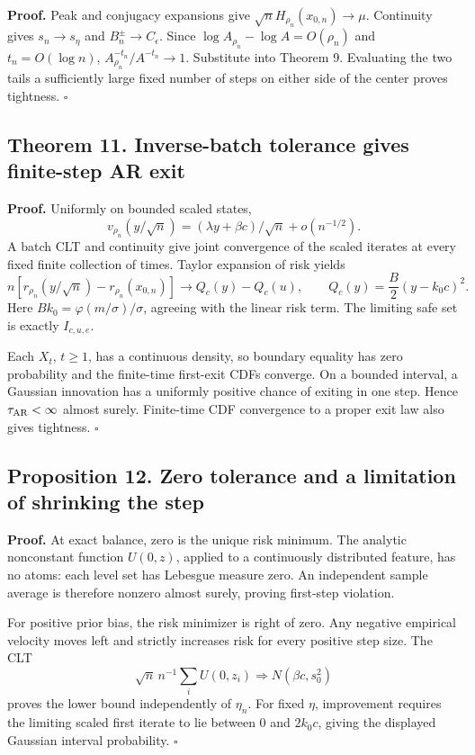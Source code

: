 \textbf{Proof.} Peak and conjugacy expansions give
\(\sqrt nH_{\rho_n}(x_{0,n})\to\mu\). Continuity gives \(s_n\to s_\eta\)
and \(B_n^\pm\to C_\epsilon\). Since
\(\log A_{\rho_n}-\log A=O(\rho_n)\) and \(t_n=O(\log n)\),
\(A_{\rho_n}^{-t_n}/A^{-t_n}\to1\). Substitute into Theorem 9.
Evaluating the two tails a sufficiently large fixed number of steps on
either side of the center proves tightness. \(\square\)

\subsection{Theorem 11. Inverse-batch tolerance gives finite-step AR
exit}\label{gaussian_proofs-theorem-11.-inverse-batch-tolerance-gives-finite-step-ar-exit}

\textbf{Proof.} Uniformly on bounded scaled states, \[
v_{\rho_n}(y/\sqrt n)
=(\lambda y+\beta c)/\sqrt n+o(n^{-1/2}).
\] A batch CLT and continuity give joint convergence of the scaled
iterates at every fixed finite collection of times. Taylor expansion of
risk yields \[
n[r_{\rho_n}(y/\sqrt n)-r_{\rho_n}(x_{0,n})]
\to Q_c(y)-Q_c(u),\qquad Q_c(y)=\frac B2(y-k_0c)^2.
\] Here \(Bk_0=\varphi(m/\sigma)/\sigma\), agreeing with the linear risk
term. The limiting safe set is exactly \(I_{c,u,e}\).

Each \(X_t\), \(t\ge1\), has a continuous density, so boundary equality
has zero probability and the finite-time first-exit CDFs converge. On a
bounded interval, a Gaussian innovation has a uniformly positive chance
of exiting in one step. Hence \(\tau_{\rm AR}<\infty\) almost surely.
Finite-time CDF convergence to a proper exit law also gives tightness.
\(\square\)

\subsection{Proposition 12. Zero tolerance and a limitation of shrinking
the
step}\label{gaussian_proofs-proposition-12.-zero-tolerance-and-a-limitation-of-shrinking-the-step}

\textbf{Proof.} At exact balance, zero is the unique risk minimum. The
analytic nonconstant function \(U(0,z)\), applied to a continuously
distributed feature, has no atoms: each level set has Lebesgue measure
zero. An independent sample average is therefore nonzero almost surely,
proving first-step violation.

For positive prior bias, the risk minimizer is right of zero. Any
negative empirical velocity moves left and strictly increases risk for
every positive step size. The CLT \[
\sqrt n\,n^{-1}\sum_iU(0,z_i)\Rightarrow N(\beta c,s_0^2)
\] proves the lower bound independently of \(\eta_n\). For fixed
\(\eta\), improvement requires the limiting scaled first iterate to lie
between \(0\) and \(2k_0c\), giving the displayed Gaussian interval
probability. \(\square\)
